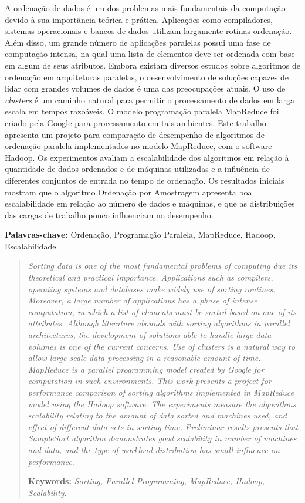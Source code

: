 \begin{resumo}

A ordenação de dados é um dos problemas mais fundamentais da computação devido à sua importância teórica e prática. Aplicações como compiladores, sistemas operacionais e bancos de dados utilizam largamente rotinas ordenação. Além disso, um grande número de aplicações paralelas possui uma fase de computação intensa, na qual uma lista de elementos deve ser ordenada com base em algum de seus atributos. Embora existam diversos estudos sobre algoritmos de ordenação em arquiteturas paralelas, o desenvolvimento de soluções capazes de lidar com grandes volumes de dados é uma das preocupações atuais. O uso de \textit{clusters} é um caminho natural para permitir o processamento de dados em larga escala em tempos razoáveis. O modelo programação paralela MapReduce foi criado pela Google para processamento em tais ambientes. Este trabalho apresenta um projeto para comparação de desempenho de algoritmos de ordenação paralela implementados no modelo MapReduce, com o software Hadoop. Os experimentos avaliam a escalabilidade dos algoritmos em relação à quantidade de dados ordenados e de máquinas utilizadas e a influência de diferentes conjuntos de entrada no tempo de ordenação. Os resultados iniciais mostram que o algoritmo Ordenação por Amostragem apresenta boa escalabilidade em relação ao número de dados e máquinas, e que as distribuições das cargas de trabalho pouco influenciam no desempenho. 
    
\textbf{Palavras-chave:} Ordenação, Programação Paralela, MapReduce, Hadoop, Escalabilidade
\end{resumo}


\begin{abstract}

\textit{Sorting data is one of the most fundamental problems of computing due its theoretical and practical importance. Applications such as compilers, operating systems and databases make widely use of sorting routines. Moreover, a large number of applications has a phase of intense computation, in which a list of elements must be sorted based on one of its attributes. Although literature abounds with sorting algorithms in parallel architectures, the development of solutions able to handle large data volumes is one of the current concerns. Use of clusters is a natural way to allow large-scale data processing in a reasonable amount of time. MapReduce is a parallel programming model created by Google for computation in such environments. This work presents a project for performance comparison of sorting algorithms implemented in MapReduce model using the Hadoop software. 
The experiments measure the algorithms scalability relating to the amount of data sorted and machines used, and effect of different data sets in sorting time. Preliminar results presents that SampleSort algorithm demonstrates good scalability in number of machines and data, and the type of workload distribution has small influence on performance.}
	
\textbf{Keywords:} \textit{Sorting, Parallel Programming, MapReduce, Hadoop, Scalability.}
\end{abstract}
